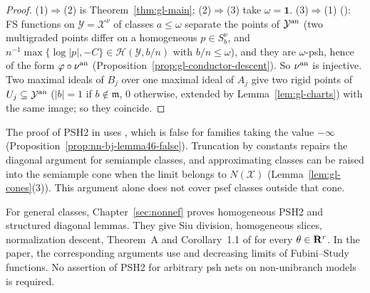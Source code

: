 \begin{proof}
(1)$\Rightarrow$(2) is Theorem~\ref{thm:gl-main}; (2)$\Rightarrow$(3) take $\omega=\mathbf1$. (3)$\Rightarrow$(1) (\cite[Theorem~5.12]{BJ22}): FS functions on $\mathcal Y=\mathcal
X^\nu$ of classes $a\le\omega$ separate the points of $\mathcal Y^{\mathrm{an}}$ (two multigraded points differ on a homogeneous $p\in S^\nu_b$, and $n^{-1}\max\{\log|p|,-C\}\in
\mathcal H(\mathcal Y,b/n)$ with $b/n\le\omega$), and they are $\omega$-psh, hence of the form $\varphi\circ\nu^{\mathrm{an}}$ (Proposition~\ref{prop:gl-conductor-descent}). So
$\nu^{\mathrm{an}}$ is injective. Two maximal ideals of $B_j$ over one maximal ideal of $A_j$ give two rigid points of $U_j\subseteq\mathcal Y^{\mathrm{an}}$ ($|b|=1$ if $b\notin\mathfrak m$, $0$
otherwise, extended by Lemma~\ref{lem:gl-charts}) with the same image; so they coincide.
\end{proof}

\begin{remark}\label{rmk:gl-nonnef}
The proof of PSH2 in \cite[Theorem~4.5]{BJ22} uses \cite[Lemma~4.6]{BJ22},
which is false for families taking the value $-\infty$ (Proposition~\ref{prop:nn-bj-lemma46-false}).
Truncation by constants repairs the diagonal argument for semiample classes, and approximating
classes can be raised into the semiample cone when the limit belongs to $N(\mathcal X)$
(Lemma~\ref{lem:gl-cones}(3)). This argument alone does not cover psef classes outside that cone.

For general classes, Chapter~\ref{sec:nonnef} proves homogeneous PSH2 and structured diagonal
lemmas. They give Siu division, homogeneous slices, normalization descent, Theorem~A and
Corollary~1.1 of \cite{FHX} for every $\theta\in\mathbf{R}^r$. In the paper, the corresponding arguments
use \cite[Lemmas~2.3 and~7.4]{FHX} and decreasing limits of Fubini--Study functions.
No assertion of PSH2 for arbitrary psh nets on non-unibranch models is required.
\end{remark}

